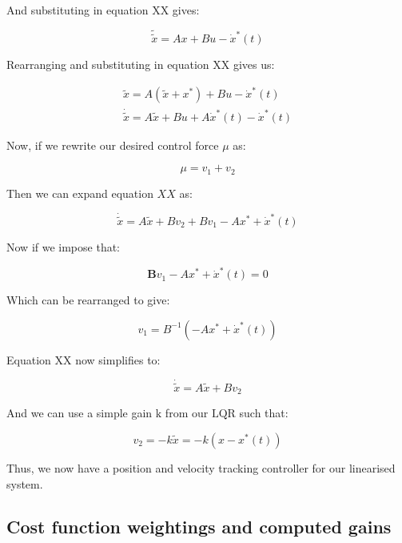 \documentclass{UoNMCHA}
\numberwithin{equation}{section}
\begin{document}
	And substituting in equation XX gives:
	
	\begin{equation}
	\tilde{\tilde{x}}=A x+B u-\dot{x}^{*}(t)
	\end{equation}

	Rearranging and substituting in equation XX gives us:
	
	\begin{align}
	\tilde{x}=A\left(\tilde{x}+x^{*}\right)+B u-\dot{x}^{*}(t) \\
		\dot{\tilde{x}}=A \tilde{x}+B u+A \dot{x}^{*}(t)-\dot{x}^{*}(t)
	\end{align}

	Now, if we rewrite our desired control force $\mu$ as:
	
	\begin{equation}
	\mu=v_{1}+v_{2}
	\end{equation}
	
	Then we can expand equation $X X$ as:
	
	\begin{equation}
	\dot{\tilde{x}}=A \tilde{x}+B v_{2}+B v_{1}-A x^{*}+\dot{x}^{*}(t)
	\end{equation}

	\newpage
	
	Now if we impose that:
	
	\begin{equation}
	\boldsymbol{B} v_{1}-A x^{*}+\dot{x}^{*}(t)=0
	\end{equation}
	
	Which can be rearranged to give:
	
	\begin{equation}
	v_{1}=B^{-1}\left(-A x^{*}+\dot{x}^{*}(t)\right)
	\end{equation}
	
	Equation XX now simplifies to:
	
	\begin{equation}
	\dot{\tilde{x}}=A \tilde{x}+B v_{2}
	\end{equation}
	
	And we can use a simple gain $\mathrm{k}$ from our $\mathrm{LQR}$ such that:
	
	\begin{equation}
	v_{2}=-k \tilde{x}=-k\left(x-x^{*}(t)\right)
	\end{equation}
		
	Thus, we now have a position and velocity tracking controller for our linearised system.
	
	\subsection{Cost function weightings and computed gains}
	
\end{document}
